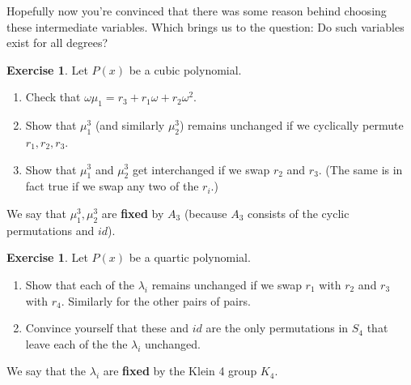 \documentclass[reqno, 12pt, letter]{article}
\theoremstyle{plain}
\theoremstyle{definition}
\newtheorem{remark}[theorem]{Remark}
\newtheorem{exercise}[theorem]{Exercise}
\theoremstyle{remark}
\numberwithin{equation}{section}
\begin{document}
Hopefully now you're convinced that there was some reason behind choosing these intermediate variables. Which brings us to the question: Do such variables exist for all degrees?
%
%
\begin{exercise}
	Let $ P(x)$ be a cubic polynomial.
	\begin{enumerate}
		\item Check that $ \omega \mu_1 = r_3 + r_1 \omega + r_2 \omega^2$.
		\item Show that $ \mu_1^3$ (and similarly $ \mu_2^3$) remains unchanged if we cyclically permute $ r_1, r_2, r_3$.
		\item Show that $ \mu_1^3$ and $ \mu_2^3$ get interchanged if we swap $ r_2$ and $ r_3$. (The same is in fact true if we swap any two of the $ r_i$.)
	\end{enumerate}
	We say that $ \mu_1^3, \mu_2^3$ are \textbf{fixed} by $ A_3$ (because $ A_3$ consists of the cyclic permutations and $ id$).
\end{exercise}

\begin{exercise}
	Let $ P(x)$ be a quartic polynomial.
	\begin{enumerate}
		\item Show that each of the $ \lambda_i$ remains unchanged if we swap $ r_1$ with $r_2$ and $ r_3$ with $ r_4$. Similarly for the other pairs of pairs.
		\item Convince yourself that these and $ id$ are the only permutations in $ S_4$ that leave each of the the $ \lambda_i$ unchanged.
	\end{enumerate}
	We say that the $ \lambda_i$ are \textbf{fixed} by the Klein 4 group $K_4$.
\end{exercise}
\end{document}
